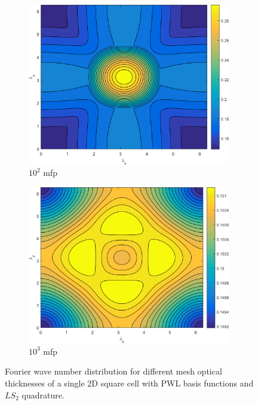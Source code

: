 \begin{figure}
{\begin{subfigure}[b]{0.485\textwidth}
		\centering
		\includegraphics[width=0.975\textwidth]{figures/appendices/SI_M4S_UPWLD1_LS2_x=100_dydx=1_contour.png}
		\caption{$10^{2}$ mfp}
	\end{subfigure}
	\hfill
	\begin{subfigure}[b]{0.485\textwidth}
		\centering
		\includegraphics[width=0.975\textwidth]{figures/appendices/SI_M4S_UPWLD1_LS2_x=1000_dydx=1_contour.png}
		\caption{$10^{3}$ mfp}
	\end{subfigure}
	}
\caption{Fourier wave number distribution for different mesh optical thicknesses of a single 2D square cell with PWL basis functions and $LS_{2}$ quadrature.}
\label{fig::App_DSA_M4S_LS2}
\end{figure}

